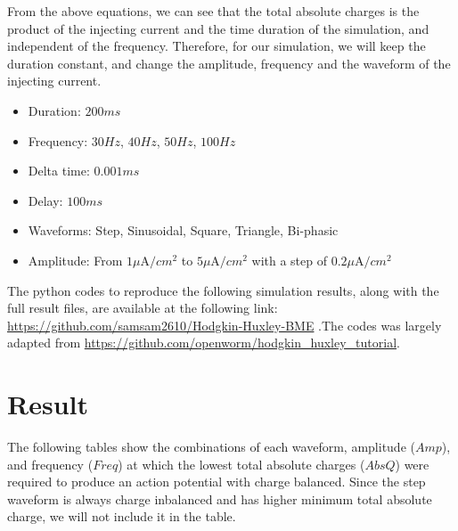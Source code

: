 \documentclass[letterpaper,12pt]{article}
\begin{document}
\noindent From the above equations, we can see that the total absolute charges is the product of the injecting current and the time duration of the simulation, and independent of the frequency. Therefore, for our simulation, we will keep the duration constant, and change the amplitude, frequency and the waveform of the injecting current.
\begin{multicols}{2}
    \begin{itemize}
        \item Duration: $200ms$
        \item Frequency: $30Hz$, $40Hz$, $50Hz$, $100Hz$
        \item Delta time: $0.001ms$
        \item Delay: $100ms$
        \item Waveforms: Step, Sinusoidal, Square, Triangle, Bi-phasic
        \item Amplitude: From $1\mu\text{A}/cm^2$ to $5\mu\text{A}/cm^2$ with a step of $0.2\mu\text{A}/cm^2$
    \end{itemize}
\end{multicols}
\noindent The python codes to reproduce the following simulation results, along with the full result files, are available at the following link:
\noindent \url{https://github.com/samsam2610/Hodgkin-Huxley-BME}
\noindent .The codes was largely adapted from \url{https://github.com/openworm/hodgkin_huxley_tutorial}.

\section*{Result}
\noindent The following tables show the combinations of each waveform, amplitude ($Amp$), and frequency ($Freq$) at which the lowest total absolute charges ($AbsQ$) were required to produce an action potential with charge balanced. Since the step waveform is always charge inbalanced and has higher minimum total absolute charge, we will not include it in the table. 
\end{document}
